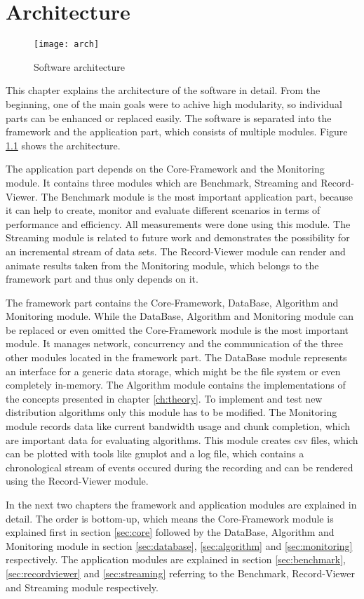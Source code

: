 \chapter{Architecture}
\label{ch:arch}

\begin{figure}[ht]
	\centering
	\texttt{[image: arch]}
	\caption{Software architecture}
	\label{fig:arch}
\end{figure}

This chapter explains the architecture of the software in detail. From the beginning, one of the main goals were to achive high modularity, so individual parts can be enhanced or replaced easily. The software is separated into the framework and the application part, which consists of multiple modules. Figure \ref{fig:arch} shows the architecture. 

The application part depends on the Core-Framework and the Monitoring module. It contains three modules which are Benchmark, Streaming and Record-Viewer. The Benchmark module is the most important application part, because it can help to create, monitor and evaluate different scenarios in terms of performance and efficiency. All measurements were done using this module. The Streaming module is related to future work and demonstrates the possibility for an incremental stream of data sets. The Record-Viewer module can render and animate results taken from the Monitoring module, which belongs to the framework part and thus only depends on it.

The framework part contains the Core-Framework, DataBase, Algorithm and Monitoring module. While the DataBase, Algorithm and Monitoring module can be replaced or even omitted the Core-Framework module is the most important module. It manages network, concurrency and the communication of the three other modules located in the framework part. The DataBase module represents an interface for a generic data storage, which might be the file system or even completely in-memory. The Algorithm module contains the implementations of the concepts presented in chapter \ref{ch:theory}. To implement and test new distribution algorithms only this module has to be modified. The Monitoring module records data like current bandwidth usage and chunk completion, which are important data for evaluating algorithms. This module creates csv files, which can be plotted with tools like gnuplot and a log file, which contains a chronological stream of events occured during the recording and can be rendered using the Record-Viewer module.

In the next two chapters the framework and application modules are explained in detail. The order is bottom-up, which means the Core-Framework module is explained first in section \ref{sec:core} followed by the DataBase, Algorithm and Monitoring module in section \ref{sec:database}, \ref{sec:algorithm} and \ref{sec:monitoring} respectively. The application modules are explained in section \ref{sec:benchmark}, \ref{sec:recordviewer} and \ref{sec:streaming} referring to the Benchmark, Record-Viewer and Streaming module respectively.